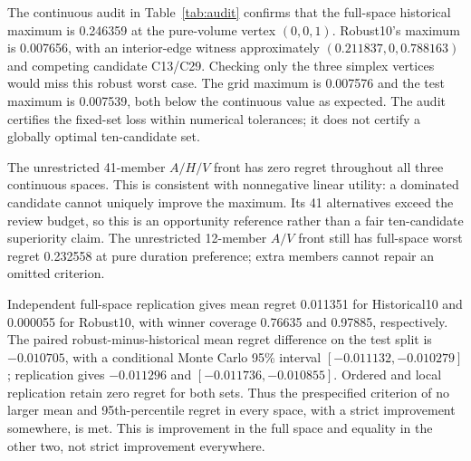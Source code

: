\documentclass{llncs}
\begin{document}
The continuous audit in Table~\ref{tab:audit} confirms that the full-space historical maximum is 0.246359 at the pure-volume vertex $(0,0,1)$. Robust10's maximum is 0.007656, with an interior-edge witness approximately $(0.211837,0,0.788163)$ and competing candidate C13/C29. Checking only the three simplex vertices would miss this robust worst case. The grid maximum is 0.007576 and the test maximum is 0.007539, both below the continuous value as expected. The audit certifies the fixed-set loss within numerical tolerances; it does not certify a globally optimal ten-candidate set.

The unrestricted 41-member $A/H/V$ front has zero regret throughout all three continuous spaces. This is consistent with nonnegative linear utility: a dominated candidate cannot uniquely improve the maximum. Its 41 alternatives exceed the review budget, so this is an opportunity reference rather than a fair ten-candidate superiority claim. The unrestricted 12-member $A/V$ front still has full-space worst regret 0.232558 at pure duration preference; extra members cannot repair an omitted criterion.

Independent full-space replication gives mean regret 0.011351 for Historical10 and 0.000055 for Robust10, with winner coverage 0.76635 and 0.97885, respectively. The paired robust-minus-historical mean regret difference on the test split is $-0.010705$, with a conditional Monte Carlo 95\% interval $[-0.011132,-0.010279]$; replication gives $-0.011296$ and $[-0.011736,-0.010855]$. Ordered and local replication retain zero regret for both sets. Thus the prespecified criterion of no larger mean and 95th-percentile regret in every space, with a strict improvement somewhere, is met. This is improvement in the full space and equality in the other two, not strict improvement everywhere.
\end{document}
